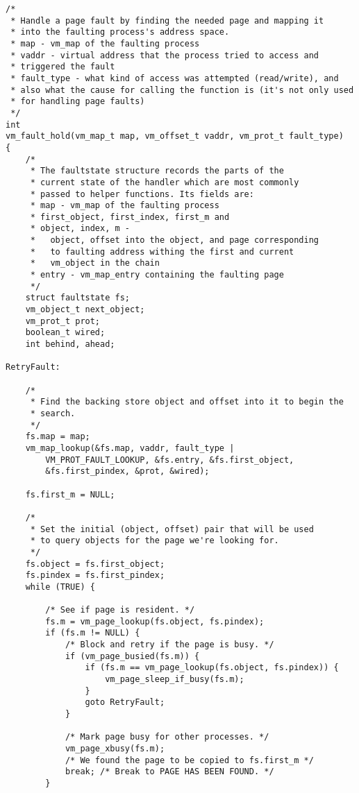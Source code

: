 \documentclass[shortabstract, english]{iithesis}
\newenvironment{code}{}{}
\begin{document}
\begin{code}
\begin{verbatim}
/*
 * Handle a page fault by finding the needed page and mapping it
 * into the faulting process's address space.
 * map - vm_map of the faulting process
 * vaddr - virtual address that the process tried to access and
 * triggered the fault
 * fault_type - what kind of access was attempted (read/write), and
 * also what the cause for calling the function is (it's not only used
 * for handling page faults)
 */
int
vm_fault_hold(vm_map_t map, vm_offset_t vaddr, vm_prot_t fault_type)
{
    /*
     * The faultstate structure records the parts of the
     * current state of the handler which are most commonly
     * passed to helper functions. Its fields are:
     * map - vm_map of the faulting process
     * first_object, first_index, first_m and
     * object, index, m -
     *   object, offset into the object, and page corresponding
     *   to faulting address withing the first and current
     *   vm_object in the chain
     * entry - vm_map_entry containing the faulting page
     */
    struct faultstate fs;
    vm_object_t next_object;
    vm_prot_t prot;
    boolean_t wired;
    int behind, ahead;

RetryFault:

    /*
     * Find the backing store object and offset into it to begin the
     * search.
     */
    fs.map = map;
    vm_map_lookup(&fs.map, vaddr, fault_type |
        VM_PROT_FAULT_LOOKUP, &fs.entry, &fs.first_object,
        &fs.first_pindex, &prot, &wired);

    fs.first_m = NULL;

    /*
     * Set the initial (object, offset) pair that will be used
     * to query objects for the page we're looking for.
     */
    fs.object = fs.first_object;
    fs.pindex = fs.first_pindex;
    while (TRUE) {

        /* See if page is resident. */
        fs.m = vm_page_lookup(fs.object, fs.pindex);
        if (fs.m != NULL) {
            /* Block and retry if the page is busy. */
            if (vm_page_busied(fs.m)) {
                if (fs.m == vm_page_lookup(fs.object, fs.pindex)) {
                    vm_page_sleep_if_busy(fs.m);
                }
                goto RetryFault;
            }

            /* Mark page busy for other processes. */
            vm_page_xbusy(fs.m);
            /* We found the page to be copied to fs.first_m */
            break; /* Break to PAGE HAS BEEN FOUND. */
        }


\end{verbatim}
\end{code}
\end{document}
